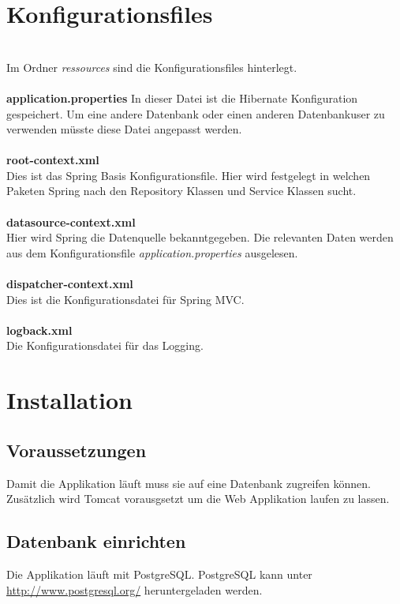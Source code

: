 \section{Konfigurationsfiles}\\
Im Ordner \emph{ressources} sind die Konfigurationsfiles hinterlegt.\\
\\
\textbf{application.properties}
In dieser Datei ist die Hibernate Konfiguration gespeichert. Um eine andere Datenbank oder einen anderen Datenbankuser zu verwenden müsste diese Datei angepasst werden.\\
\\
\textbf{root-context.xml}\\
Dies ist das Spring Basis Konfigurationsfile. Hier wird festgelegt in welchen Paketen Spring nach den Repository Klassen und Service Klassen sucht.\\
\\
\textbf{datasource-context.xml}\\
Hier wird Spring die Datenquelle bekanntgegeben. Die relevanten Daten werden aus dem Konfigurationsfile \emph{application.properties} ausgelesen.\\
\\
\textbf{dispatcher-context.xml}\\
Dies ist die Konfigurationsdatei für Spring MVC.\\
\\
\textbf{logback.xml}\\
Die Konfigurationsdatei für das Logging.



\section{Installation}

\subsection{Voraussetzungen}
Damit die Applikation läuft muss sie auf eine Datenbank zugreifen können. Zusätzlich wird Tomcat \cite{Tomcat} vorausgsetzt um die Web Applikation laufen zu lassen.

\subsection{Datenbank einrichten}
Die Applikation läuft mit PostgreSQL. PostgreSQL kann unter \url{http://www.postgresql.org/} heruntergeladen werden.

